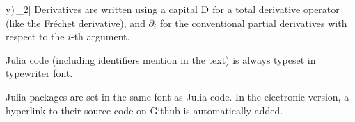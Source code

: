 \begin{symbolicfootnotes}
\begin{description}[style=nextline, leftmargin=4cm]
{      y)\,\Delta_2\)}] Derivatives are written using a capital \(\mathop{}\!\mathrm{D}\) for a total derivative
    operator (like the Fréchet derivative), and \(\partial_i\) for the conventional partial
    derivatives with respect to the \(i\)-th argument.
  \item[{\jlinlfont f(x) = rand(x)}] Julia code (including identifiers mention in the text) is
    always typeset in typewriter font.
  \item[{\irtrackerjl{}}] Julia packages are set in the same font as Julia code.  In the electronic
    version, a hyperlink to their source code on Github is automatically added.
  \end{description}
\end{symbolicfootnotes}

